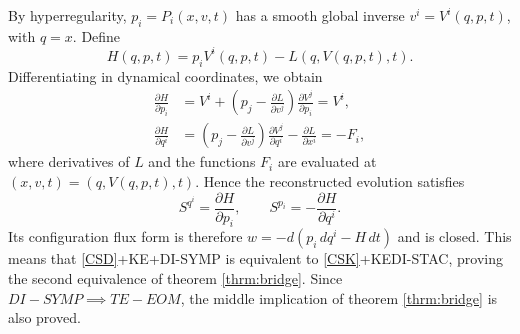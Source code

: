 \documentclass[12pt]{article}
\begin{document}
By hyperregularity, $p_i=P_i(x,v,t)$ has a smooth global inverse
$v^i=V^i(q,p,t)$, with $q=x$. Define
\begin{equation}
	H(q,p,t)
	=
	p_iV^i(q,p,t)-L(q,V(q,p,t),t).
\end{equation}
Differentiating in dynamical coordinates, we obtain
\begin{equation}
	\begin{aligned}
		\frac{\partial H}{\partial p_i}
		&=
		V^i+
		\left(p_j-\frac{\partial L}{\partial v^j}\right)
		\frac{\partial V^j}{\partial p_i}
		=
		V^i,\\
		\frac{\partial H}{\partial q^i}
		&=
		\left(p_j-\frac{\partial L}{\partial v^j}\right)
		\frac{\partial V^j}{\partial q^i}
		-
		\frac{\partial L}{\partial x^i}
		=
		-F_i,
	\end{aligned}
\end{equation}
where derivatives of $L$ and the functions $F_i$ are evaluated at
$(x,v,t)=(q,V(q,p,t),t)$. Hence the reconstructed evolution satisfies
\begin{equation}
	S^{q^i}=\frac{\partial H}{\partial p_i},
	\qquad
	S^{p_i}=-\frac{\partial H}{\partial q^i}.
\end{equation}
Its configuration flux form is therefore
$w=-d(p_i\,dq^i-H\,dt)$ and is closed. This means that \ref{CSD}+KE+DI-SYMP is equivalent to \ref{CSK}+KEDI-STAC, proving the second equivalence of theorem \ref{thrm:bridge}. Since $DI-SYMP \implies TE-EOM$, the middle implication of theorem \ref{thrm:bridge} is also proved.
\end{document}
